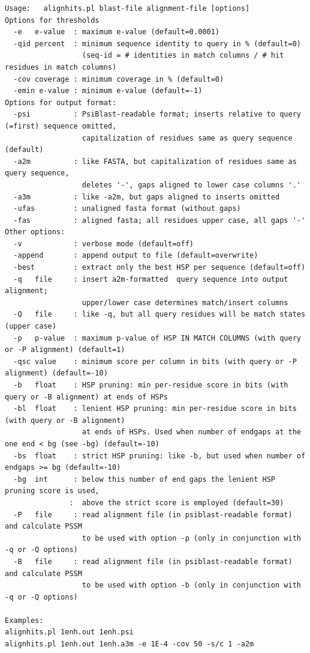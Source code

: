 \documentclass[11pt,a4paper]{article}
\begin{document}
\small \begin{verbatim}
Usage:   alignhits.pl blast-file alignment-file [options]
Options for thresholds
  -e   e-value  : maximum e-value (default=0.0001)
  -qid percent  : minimum sequence identity to query in % (default=0) 
                  (seq-id = # identities in match columns / # hit residues in match columns)
  -cov coverage : minimum coverage in % (default=0) 
  -emin e-value : minimum e-value (default=-1)
Options for output format:
  -psi          : PsiBlast-readable format; inserts relative to query (=first) sequence omitted, 
                  capitalization of residues same as query sequence (default)
  -a2m          : like FASTA, but capitalization of residues same as query sequence,
                  deletes '-', gaps aligned to lower case columns '.'
  -a3m          : like -a2m, but gaps aligned to inserts omitted
  -ufas         : unaligned fasta format (without gaps)
  -fas          : aligned fasta; all residues upper case, all gaps '-'
Other options:
  -v            : verbose mode (default=off)
  -append       : append output to file (default=overwrite)
  -best         : extract only the best HSP per sequence (default=off)
  -q   file     : insert a2m-formatted  query sequence into output alignment;
                  upper/lower case determines match/insert columns
  -Q   file     : like -q, but all query residues will be match states (upper case)
  -p   p-value  : maximum p-value of HSP IN MATCH COLUMNS (with query or -P alignment) (default=1)
  -qsc value    : minimum score per column in bits (with query or -P alignment) (default=-10) 
  -b   float    : HSP pruning: min per-residue score in bits (with query or -B alignment) at ends of HSPs
  -bl  float    : lenient HSP pruning: min per-residue score in bits (with query or -B alignment)
                  at ends of HSPs. Used when number of endgaps at the one end < bg (see -bg) (default=-10)
  -bs  float    : strict HSP pruning: like -b, but used when number of endgaps >= bg (default=-10)
  -bg  int      : below this number of end gaps the lenient HSP pruning score is used,
               :  above the strict score is employed (default=30)
  -P   file     : read alignment file (in psiblast-readable format) and calculate PSSM
                  to be used with option -p (only in conjunction with -q or -Q options)
  -B   file     : read alignment file (in psiblast-readable format) and calculate PSSM
                  to be used with option -b (only in conjunction with -q or -Q options)

Examples: 
alignhits.pl 1enh.out 1enh.psi
alignhits.pl 1enh.out 1enh.a3m -e 1E-4 -cov 50 -s/c 1 -a2m
\end{verbatim} \normalsize
\end{document}
